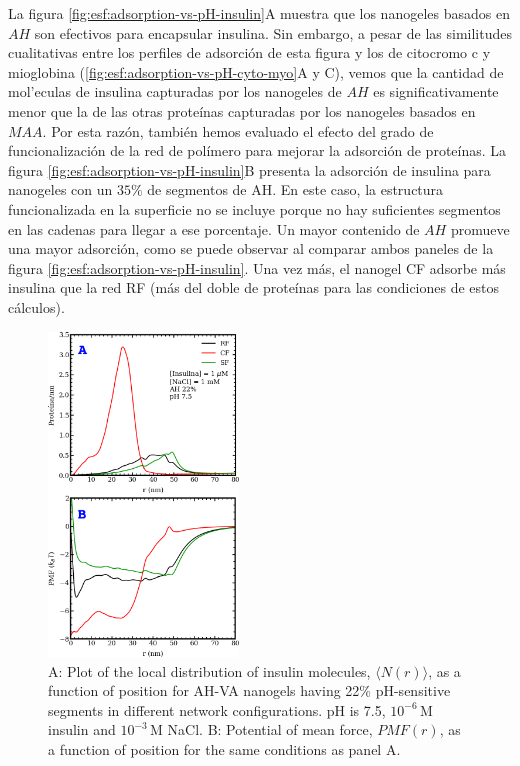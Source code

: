 La figura \ref{fig:esf:adsorption-vs-pH-insulin}A muestra que los nanogeles basados en $AH$ son efectivos para encapsular insulina.
Sin embargo, a pesar de las similitudes cualitativas entre los perfiles de adsorci\'on de esta figura y los de citocromo c y mioglobina (\ref{fig:esf:adsorption-vs-pH-cyto-myo}A y C), vemos que la cantidad de mol'eculas de insulina capturadas por los nanogeles de $AH$ es significativamente menor que la de las otras prote\'inas capturadas por los nanogeles basados en $MAA$.
Por esta raz\'on, tambi\'en hemos evaluado el efecto del grado de funcionalizaci\'on de la red de pol\'imero para mejorar la adsorci\'on de prote\'inas.
La figura \ref{fig:esf:adsorption-vs-pH-insulin}B presenta la adsorci\'on de insulina para nanogeles con un $35\%$ de segmentos de AH.
En este caso, la estructura funcionalizada en la superficie no se incluye porque no hay suficientes segmentos en las cadenas para llegar a ese porcentaje.
Un mayor contenido de $AH$ promueve una mayor adsorci\'on, como se puede observar al comparar ambos paneles de la figura \ref{fig:esf:adsorption-vs-pH-insulin}.
Una vez m\'as, el nanogel CF adsorbe m\'as insulina que la red RF (m\'as del doble de prote\'inas para las condiciones de estos c\'alculos).




\begin{figure}[!htb]
    \centering
    \includegraphics[width=0.45\textwidth]{Figures/graphs-gel2/insu-ads-pmf.pdf}
    \caption{A: Plot of the local distribution of insulin molecules, $\langle N(r)\rangle$, as a function of position for AH-VA nanogels having 22\% pH-sensitive segments in different network configurations.
    pH is 7.5, $10^{-6}$\,M insulin and  $10^{-3}$\,M NaCl.
    B: Potential of mean force,  ${PMF}(r)$, as a function of position for the same conditions as panel A.}
    \label{fig:esf:adsorption-vs-r-insulin}
\end{figure}



